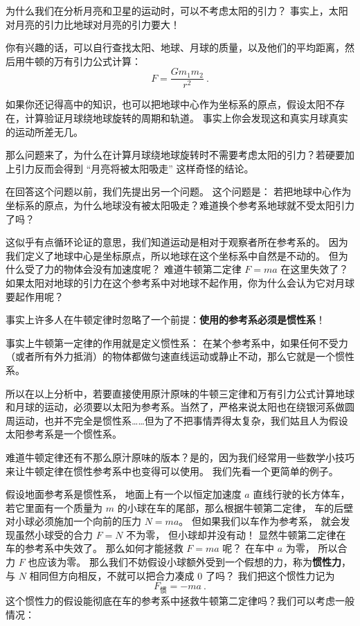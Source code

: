 
为什么我们在分析月亮和卫星的运动时，可以不考虑太阳的引力？ 事实上，太阳对月亮的引力比地球对月亮的引力要大！

你有兴趣的话，可以自行查找太阳、地球、月球的质量，以及他们的平均距离，然后用牛顿的万有引力公式计算：
\begin{equation}
F = \frac{Gm_1m_2}{r^2}~.
\end{equation}

如果你还记得高中的知识，也可以把地球中心作为坐标系的原点，假设太阳不存在，计算验证月球绕地球旋转的周期和轨道。 事实上你会发现这和真实月球真实的运动所差无几。

那么问题来了，为什么在计算月球绕地球旋转时不需要考虑太阳的引力？若硬要加上引力反而会得到 “月亮将被太阳吸走” 这样奇怪的结论。

在回答这个问题以前，我们先提出另一个问题。 这个问题是： 若把地球中心作为坐标系的原点，为什么地球没有被太阳吸走？难道换个参考系地球就不受太阳引力了吗？

这似乎有点循环论证的意思，我们知道运动是相对于观察者所在参考系的。 因为我们定义了地球中心是坐标原点，所以地球在这个坐标系中自然是不动的。 但为什么受了力的物体会没有加速度呢？ 难道牛顿第二定律 $F = ma$ 在这里失效了？ 如果太阳对地球的引力在这个参考系中对地球不起作用，你为什么会认为它对月球要起作用呢？

事实上许多人在牛顿定律时忽略了一个前提：\textbf{使用的参考系必须是惯性系}！

事实上牛顿第一定律的作用就是定义惯性系： 在某个参考系中，如果任何不受力（或者所有外力抵消）的物体都做匀速直线运动或静止不动，那么它就是一个惯性系。

所以在以上分析中，若要直接使用原汁原味的牛顿三定律和万有引力公式计算地球和月球的运动，必须要以太阳为参考系。当然了，严格来说太阳也在绕银河系做圆周运动，也并不完全是惯性系……但为了不把事情弄得太复杂，我们姑且人为假设太阳参考系是一个惯性系。

难道牛顿定律还有不那么原汁原味的版本？是的，因为我们经常用一些数学小技巧来让牛顿定律在惯性参考系中也变得可以使用。 我们先看一个更简单的例子。

假设地面参考系是惯性系， 地面上有一个以恒定加速度 $a$ 直线行驶的长方体车， 若它里面有一个质量为 $m$ 的小球在车的尾部，那么根据牛顿第二定律， 车的后壁对小球必须施加一个向前的压力 $N = ma$。 但如果我们以车作为参考系， 就会发现虽然小球受的合力 $F = N$ 不为零， 但小球却并没有动！ 显然牛顿第二定律在车的参考系中失效了。 那么如何才能拯救 $F = ma$ 呢？ 在车中 $a$ 为零， 所以合力 $F$ 也应该为零。 那么我们不妨假设小球额外受到一个假想的力，称为\textbf{惯性力}，与 $N$ 相同但方向相反，不就可以把合力凑成 0 了吗？ 我们把这个惯性力记为
\begin{equation}\label{eq_EquivI_1}
F_\text{惯} = -ma~.
\end{equation}
这个惯性力的假设能彻底在车的参考系中拯救牛顿第二定律吗？我们可以考虑一般情况：

